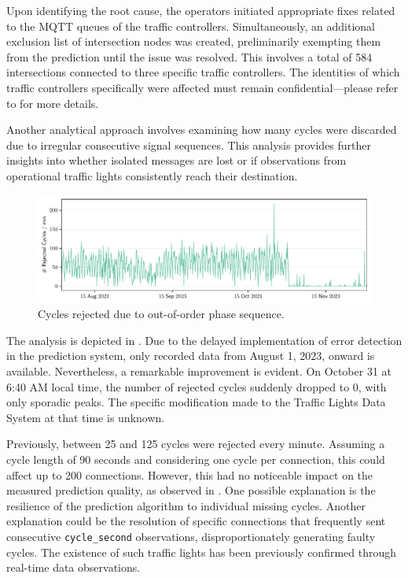 Upon identifying the root cause, the operators initiated appropriate fixes related to the MQTT queues of the traffic controllers. Simultaneously, an additional exclusion list of intersection nodes was created, preliminarily exempting them from the prediction until the issue was resolved. This involves a total of 584 intersections connected to three specific traffic controllers. The identities of which traffic controllers specifically were affected must remain confidential—please refer to \cite{neuner_leitfaden_2020} for more details.

Another analytical approach involves examining how many cycles were discarded due to irregular consecutive signal sequences. This analysis provides further insights into whether isolated messages are lost or if observations from operational traffic lights consistently reach their destination.

\begin{figure}
    \centering
    \includegraphics[width=\linewidth]{images/monitoring-rejected-cycles.pdf}
    \caption{Cycles rejected due to out-of-order phase sequence.}\label{fig:monitoring-rejected-cycles}
\end{figure}

The analysis is depicted in . Due to the delayed implementation of error detection in the prediction system, only recorded data from August 1, 2023, onward is available. Nevertheless, a remarkable improvement is evident. On October 31 at 6:40 AM local time, the number of rejected cycles suddenly dropped to 0, with only sporadic peaks. The specific modification made to the Traffic Lights Data System at that time is unknown.

Previously, between 25 and 125 cycles were rejected every minute. Assuming a cycle length of 90 seconds and considering one cycle per connection, this could affect up to 200 connections. However, this had no noticeable impact on the measured prediction quality, as observed in . One possible explanation is the resilience of the prediction algorithm to individual missing cycles. Another explanation could be the resolution of specific connections that frequently sent consecutive \texttt{cycle\_second} observations, disproportionately generating faulty cycles. The existence of such traffic lights has been previously confirmed through real-time data observations.

